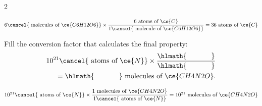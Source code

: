\documentclass[main.tex]{subfiles}
\begin{document}
\begin{multicols*}{2}
\begin{solution}
$ 6\cancel{\text{ molecules of }\ce{C6H12O6}} \times \dfrac{ 6\text{ atoms of }\ce{C}     }{1 \cancel{\text{ molecule of }\ce{C6H12O6}}   } 
=   36  \text{ atoms of }\ce{C}$
\hspace{0.1cm}\end{solution}%
\begin{question}[ID=\the\value{numA}]
Fill the conversion factor that calculates the final property:
 \begin{equation*}\begin{split}
10^{21}\cancel{\text{ atoms of }\ce{N}} \times \dfrac{\hlmath{\hspace{35pt}}}{\hlmath{\hspace{35pt}}}\\
=\hlmath{\hspace{35pt}}\text{ molecules of }\ce{CH4N2O}.
\end{split}\end{equation*}
\end{question}
\begin{solution}
$ 10^{21}\cancel{\text{ atoms of }\ce{N}} \times \dfrac{1 \text{ molecules of }\ce{CH4N2O}   }{1\cancel{\text{ atoms of }\ce{N}}    }
= 10^{21}   \text{ molecules of }\ce{CH4N2O}$
\hspace{0.1cm}\end{solution}%


\end{multicols*}
\end{document}
